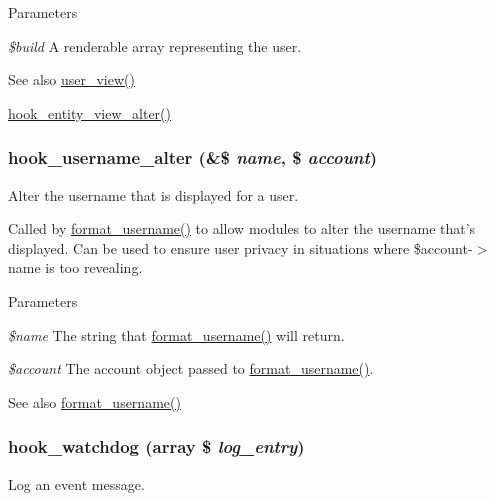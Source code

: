 \begin{DoxyParams}{Parameters}
\item[{\em \$build}]A renderable array representing the user.\end{DoxyParams}
\begin{DoxySeeAlso}{See also}
\hyperlink{user_8module_aa5b236a0e9e2aad7ff06f23bc5046914}{user\_\-view()} 

\hyperlink{group__hooks_ga2c2be6c70815b426f0eb13b0b68edb40}{hook\_\-entity\_\-view\_\-alter()} 
\end{DoxySeeAlso}
\hypertarget{group__hooks_ga877faf93c9acc42bb54cbd01cd8d9453}{
\subsubsection[{hook\_\-username\_\-alter}]{\setlength{\rightskip}{0pt plus 5cm}hook\_\-username\_\-alter (\&\$ {\em name}, \/  \$ {\em account})}}
\label{group__hooks_ga877faf93c9acc42bb54cbd01cd8d9453}
Alter the username that is displayed for a user.

Called by \hyperlink{group__format_ga7124a026ecfacc51c57a75fcc083f136}{format\_\-username()} to allow modules to alter the username that's displayed. Can be used to ensure user privacy in situations where \$account-\/$>$name is too revealing.


\begin{DoxyParams}{Parameters}
\item[{\em \$name}]The string that \hyperlink{group__format_ga7124a026ecfacc51c57a75fcc083f136}{format\_\-username()} will return.\item[{\em \$account}]The account object passed to \hyperlink{group__format_ga7124a026ecfacc51c57a75fcc083f136}{format\_\-username()}.\end{DoxyParams}
\begin{DoxySeeAlso}{See also}
\hyperlink{group__format_ga7124a026ecfacc51c57a75fcc083f136}{format\_\-username()} 
\end{DoxySeeAlso}
\hypertarget{group__hooks_gab2b8bf0289fad4b39485e933012f290c}{
\subsubsection[{hook\_\-watchdog}]{\setlength{\rightskip}{0pt plus 5cm}hook\_\-watchdog (array \$ {\em log\_\-entry})}}
\label{group__hooks_gab2b8bf0289fad4b39485e933012f290c}
Log an event message.

